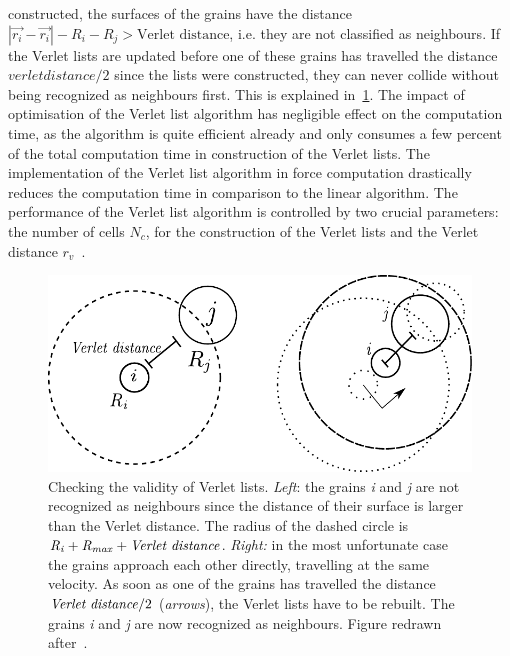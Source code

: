 constructed, the surfaces 
of the grains have the distance $\left| \overrightarrow{r_{\mathit{i}}} - 
\overrightarrow{r_{\mathit{i}}}\right| - 
\mathit{R}_{\mathit{i}}-\mathit{R}_{\mathit{j}} > 
\mbox{Verlet distance}
$, i.e. they are not classified as neighbours. If the 
Verlet lists are 
updated before one of these grains has travelled the distance 
$\mathit{verlet distance}/2$ 
since 
the lists were constructed, they can never collide without being recognized as 
neighbours first. 
This is explained in~\cref{fig:Verlet}. The impact of optimisation of the 
Verlet list 
algorithm has negligible effect on the computation time, as the algorithm is 
quite efficient 
already and only consumes a few percent of the total computation time in 
construction of the 
Verlet 
lists. The implementation of the Verlet list algorithm in force computation 
drastically reduces 
the 
computation time in comparison to the linear algorithm. The performance of the 
Verlet list 
algorithm is controlled by two crucial parameters: the number of cells 
$\mathit{N}_{\mathit{c}}$, 
for the construction of the Verlet lists and the Verlet distance 
$r_{\mathit{v}}$~\citep{Posch2005}.

\begin{figure}[htbp]
\centering
\includegraphics{Verlet}
\caption[Checking the validity of Verlet list]{Checking the validity of Verlet 
lists. 
\textit{Left}: the grains \textit{i} and \textit{j} are not recognized as 
neighbours since the 
distance of their surface is larger than the Verlet distance. The radius of 
the dashed circle is 
$\mathit{R}_{\mathit{i}}+\mathit{R}_{\mathit{max}}+\mbox{\textit{Verlet 
distance}}$. 
\textit{Right:} in the most unfortunate case the grains approach each other 
directly, 
travelling 
at the same velocity. As soon as one of the grains has travelled the 
distance $\mbox{\textit{Verlet distance}}/2$ (\textit{arrows}), the Verlet 
lists have 
to be rebuilt. The 
grains \textit{i} and \textit{j} are now recognized as neighbours. Figure 
redrawn after~\citet{Posch2005}.}
\label{fig:Verlet}
\end{figure}

